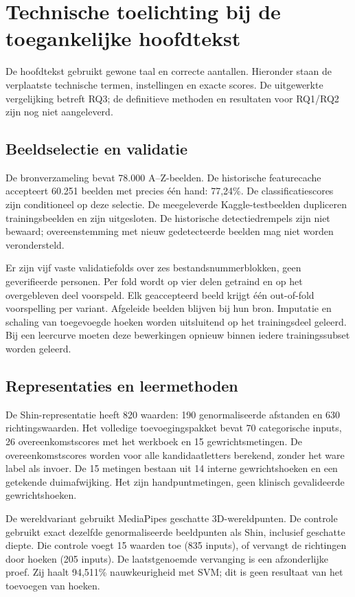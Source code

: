 \section{Technische toelichting bij de toegankelijke hoofdtekst}\label{app:technical-nl}
De hoofdtekst gebruikt gewone taal en correcte aantallen. Hieronder staan de verplaatste technische termen, instellingen en exacte scores. De uitgewerkte vergelijking betreft RQ3; de definitieve methoden en resultaten voor RQ1/RQ2 zijn nog niet aangeleverd.

\subsection{Beeldselectie en validatie}
De bronverzameling bevat 78.000 A--Z-beelden. De historische featurecache accepteert 60.251 beelden met precies \mbox{\'e\'en} hand: 77,24\%. De classificatiescores zijn conditioneel op deze selectie. De meegeleverde Kaggle-testbeelden dupliceren trainingsbeelden en zijn uitgesloten. De historische detectiedrempels zijn niet bewaard; overeenstemming met nieuw gedetecteerde beelden mag niet worden verondersteld.

Er zijn vijf vaste validatiefolds over zes bestandsnummerblokken, geen geverifieerde personen. Per fold wordt op vier delen getraind en op het overgebleven deel voorspeld. Elk geaccepteerd beeld krijgt \mbox{\'e\'en} out-of-fold voorspelling per variant. Afgeleide beelden blijven bij hun bron. Imputatie en schaling van toegevoegde hoeken worden uitsluitend op het trainingsdeel geleerd. Bij een leercurve moeten deze bewerkingen opnieuw binnen iedere trainingssubset worden geleerd.

\subsection{Representaties en leermethoden}
De Shin-representatie heeft 820 waarden: 190 genormaliseerde afstanden en 630 richtingswaarden. Het volledige toevoegingspakket bevat 70 categorische inputs, 26 overeenkomstscores met het werkboek en 15 gewrichtsmetingen. De overeenkomstscores worden voor alle kandidaatletters berekend, zonder het ware label als invoer. De 15 metingen bestaan uit 14 interne gewrichtshoeken en een getekende duimafwijking. Het zijn handpuntmetingen, geen klinisch gevalideerde gewrichtshoeken.

De wereldvariant gebruikt MediaPipes geschatte 3D-wereldpunten. De controle gebruikt exact dezelfde genormaliseerde beeldpunten als Shin, inclusief geschatte diepte. Die controle voegt 15 waarden toe (835 inputs), of vervangt de richtingen door hoeken (205 inputs). De laatstgenoemde vervanging is een afzonderlijke proef. Zij haalt 94,511\% nauwkeurigheid met SVM; dit is geen resultaat van het toevoegen van hoeken.

